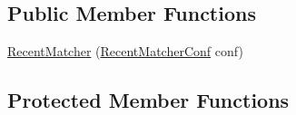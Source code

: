 \subsection*{\-Public \-Member \-Functions}
\begin{DoxyCompactItemize}
\item 
\hyperlink{classlab_1_1davidahn_1_1appshuttle_1_1predict_1_1matcher_1_1recent_1_1_recent_matcher_aa723a6521b53bd80dea0f39f0c6e0ecb}{\-Recent\-Matcher} (\hyperlink{classlab_1_1davidahn_1_1appshuttle_1_1predict_1_1matcher_1_1recent_1_1_recent_matcher_conf}{\-Recent\-Matcher\-Conf} conf)
\end{DoxyCompactItemize}
\subsection*{\-Protected \-Member \-Functions}
